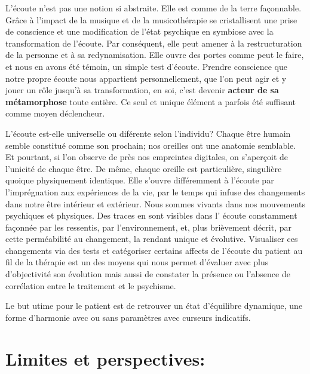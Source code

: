 L'écoute n'est pas une notion si abstraite. Elle est comme de la terre façonnable.
 Grâce à l'impact de la musique et de la musicothérapie se cristallisent
 une prise de conscience et une modification
 de  l'état psychique en symbiose avec la transformation de
 l'écoute. Par conséquent, elle peut amener à la restructuration de la personne et à
 sa redynamisation. Elle ouvre des portes comme peut le faire, et nous
 en avons été témoin, un simple test d'écoute. 
  Prendre conscience que notre propre écoute nous appartient
  personnellement, que l'on peut agir et y jouer un rôle jusqu'à sa
  transformation, en soi, c'est devenir \textbf{ acteur de sa
    métamorphose} toute entière.
  Ce seul et unique élément a parfois été suffisant comme moyen déclencheur.





  L'écoute est-elle universelle ou diférente selon l'individu?
 Chaque être humain semble constitué comme son prochain;
 nos oreilles ont  une anatomie semblable. Et pourtant, si l'on
 observe de près nos empreintes digitales, on s'aperçoit de l'unicité
 de chaque être. De même, chaque oreille est particulière, singulière
 quoique physiquement identique. Elle s'ouvre différemment à l'écoute par l'imprégnation
 aux expériences de la vie, par le temps qui infuse des changements dans
 notre être intérieur et extérieur. Nous sommes vivants dans nos
 mouvements psychiques et physiques. Des traces en sont 
 visibles dans l' écoute constamment  façonnée par les
 ressentis, par l'environnement, et, plus brièvement décrit, par cette perméabilité au
 changement, la rendant unique et évolutive.
Visualiser ces
changements via des tests et catégoriser certains affects de
l'écoute du patient au fil de la thérapie est un des moyens qui nous permet d'évaluer avec
plus d'objectivité
son évolution mais aussi
de constater la présence ou l'absence de corrélation entre le
traitement et le psychisme.


Le but utime pour le patient est de retrouver un état d'équilibre
dynamique, une forme d'harmonie avec ou sans paramètres avec curseurs indicatifs.







  \section{Limites et perspectives: }

